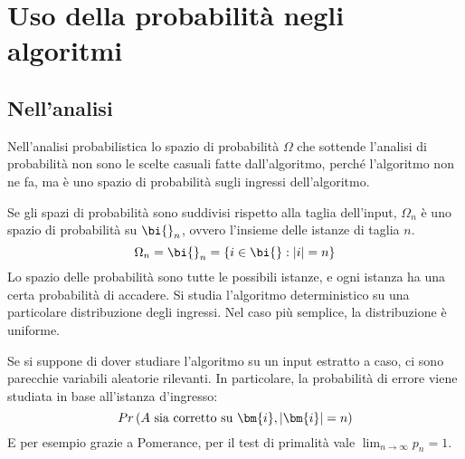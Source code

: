 \section{Uso della probabilità negli algoritmi}

\subsection{Nell'analisi}

Nell'analisi probabilistica lo spazio di probabilità $\Omega$ che sottende l'analisi di probabilità non sono le scelte casuali fatte dall'algoritmo, perché l'algoritmo non ne fa, ma è uno spazio di probabilità sugli ingressi dell'algoritmo.

Se gli spazi di probabilità sono suddivisi rispetto alla taglia dell'input, $
\Omega_n
$ è uno spazio di probabilità su $
\bi{}_n
$, ovvero l'insieme delle istanze di taglia $n$.
\begin{equation*}
    \Omega_n
    =
    \bi{}_n
    =
    \left\{ 
        i \in \bi{} : |i| = n
    \right\}
\end{equation*}
Lo spazio delle probabilità sono tutte le possibili istanze, e ogni istanza ha una certa probabilità di accadere.
Si studia l'algoritmo deterministico su una particolare distribuzione degli ingressi.
Nel caso più semplice, la distribuzione è uniforme.

Se si suppone di dover studiare l'algoritmo su un input estratto a caso, ci sono parecchie variabili aleatorie rilevanti.
In particolare, la probabilità di errore viene studiata in base all'istanza d'ingresso:
\begin{equation*}
    Pr \left( 
        \text{$A$ sia corretto su $
            \bm{i}
            , 
            |
            \bm{i}
            | = n$}
    \right)
\end{equation*}
E per esempio grazie a Pomerance, per il test di primalità vale 
$
\lim_{n \to \infty} p_n = 1
$.

